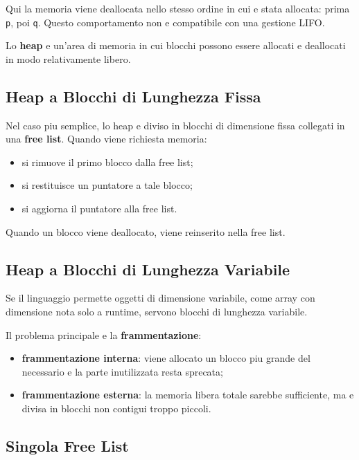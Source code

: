 \documentclass{article}
\begin{document}
Qui la memoria viene deallocata nello stesso ordine in cui e stata allocata: prima \texttt{p}, poi \texttt{q}. Questo comportamento non e compatibile con una gestione LIFO.

Lo \textbf{heap} e un'area di memoria in cui blocchi possono essere allocati e deallocati in modo relativamente libero.

\subsection{Heap a Blocchi di Lunghezza Fissa}

Nel caso piu semplice, lo heap e diviso in blocchi di dimensione fissa collegati in una \textbf{free list}. Quando viene richiesta memoria:

\begin{itemize}
  \item si rimuove il primo blocco dalla free list;
  \item si restituisce un puntatore a tale blocco;
  \item si aggiorna il puntatore alla free list.
\end{itemize}

Quando un blocco viene deallocato, viene reinserito nella free list.

\subsection{Heap a Blocchi di Lunghezza Variabile}

Se il linguaggio permette oggetti di dimensione variabile, come array con dimensione nota solo a runtime, servono blocchi di lunghezza variabile.

Il problema principale e la \textbf{frammentazione}:

\begin{itemize}
  \item \textbf{frammentazione interna}: viene allocato un blocco piu grande del necessario e la parte inutilizzata resta sprecata;
  \item \textbf{frammentazione esterna}: la memoria libera totale sarebbe sufficiente, ma e divisa in blocchi non contigui troppo piccoli.
\end{itemize}

\subsection{Singola Free List}
\end{document}

